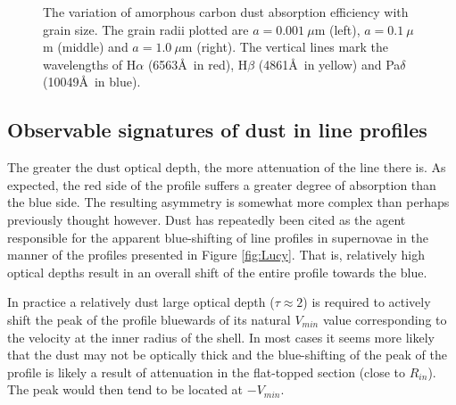 \documentclass[useAMS,usenatbib,usegraphicx]{mnras}
\begin{document}
\begin{figure}
\caption{The variation of amorphous carbon dust absorption efficiency with grain size. The grain radii plotted are $a=0.001~\mu$m (left), $a=0.1~\mu$m (middle) and $a=1.0~\mu$m (right).  The vertical lines mark the wavelengths of H$\alpha$ (6563\AA\ in red), H$\beta$ (4861\AA\ in yellow) and Pa$\delta$ (10049\AA\ in blue).}
\label{wav_dep2}
\end{figure}






\subsection{Observable signatures of dust in line profiles}
\label{asym}

The greater the dust optical depth, the more attenuation of the line 
there is.  As expected, the red side of the profile suffers a greater 
degree of absorption than the blue side.  The resulting asymmetry is 
somewhat more complex than perhaps previously thought however.  Dust has 
repeatedly been cited as the agent responsible for the apparent 
blue-shifting of line profiles in supernovae in the manner of the profiles 
presented in Figure \ref{fig:Lucy}.  That is, relatively high optical 
depths result in an overall shift of the entire profile towards the blue.

In practice a relatively dust large optical depth ($\tau \approx 2$) is 
required to actively shift the peak of the profile bluewards of its natural 
$V_{min}$ value corresponding to the velocity at the inner radius of the shell.  In most cases it seems more likely that the dust
may not be optically thick and the blue-shifting of the peak of the profile is 
likely a result of attenuation in the flat-topped section (close to 
$R_{in}$).  The peak would then tend to be located at $-V_{min}$.
\end{document}
